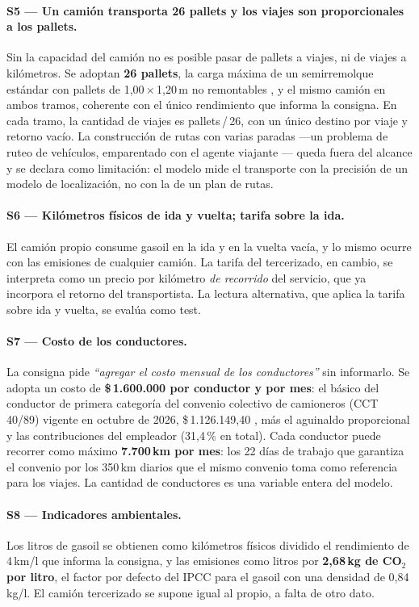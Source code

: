 \documentclass[10pt,a4paper]{article}
\newcommand{\cita}[1]{\emph{``#1''}}
\begin{document}
\paragraph{S5 — Un camión transporta 26 pallets y los viajes son proporcionales
a los pallets.} Sin la capacidad del camión no es posible pasar de pallets a
viajes, ni de viajes a kilómetros. Se adoptan \textbf{26 pallets}, la carga
máxima de un semirremolque estándar con pallets de 1,00\,×\,1,20\,m no
remontables \cite{dsv}, y el mismo camión en ambos tramos, coherente con el
único rendimiento que informa la consigna. En cada tramo, la cantidad de
viajes es pallets\,/\,26, con un único destino por viaje y retorno vacío. La
construcción de rutas con varias paradas —un problema de ruteo de vehículos,
emparentado con el agente viajante \cite{catedra-redes}— queda fuera del
alcance y se declara como limitación: el modelo mide el transporte con la
precisión de un modelo de localización, no con la de un plan de rutas.

\paragraph{S6 — Kilómetros físicos de ida y vuelta; tarifa sobre la ida.}
El camión propio consume gasoil en la ida y en la vuelta vacía, y lo mismo
ocurre con las emisiones de cualquier camión. La tarifa del tercerizado, en
cambio, se interpreta como un precio por kilómetro \emph{de recorrido} del
servicio, que ya incorpora el retorno del transportista. La lectura
alternativa, que aplica la tarifa sobre ida y vuelta, se evalúa como test.

\paragraph{S7 — Costo de los conductores.} La consigna pide \cita{agregar el
costo mensual de los conductores} sin informarlo. Se adopta un costo de
\textbf{\$\,1.600.000 por conductor y por mes}: el básico del conductor de
primera categoría del convenio colectivo de camioneros (CCT 40/89) vigente en
octubre de 2026, \$\,1.126.149,40 \cite{cct}, más el aguinaldo proporcional y
las contribuciones del empleador (31,4\,\% en total). Cada conductor puede
recorrer como máximo \textbf{7.700\,km por mes}: los 22 días de trabajo que
garantiza el convenio por los 350\,km diarios que el mismo convenio toma como
referencia para los viajes. La cantidad de conductores es una variable entera
del modelo.

\paragraph{S8 — Indicadores ambientales.} Los litros de gasoil se obtienen
como kilómetros físicos dividido el rendimiento de 4\,km/l que informa la
consigna, y las emisiones como litros por \textbf{2,68\,kg de CO$_2$ por
litro}, el factor por defecto del IPCC para el gasoil \cite{ipcc} con una
densidad de 0,84\,kg/l. El camión tercerizado se supone igual al propio, a
falta de otro dato.
\end{document}
